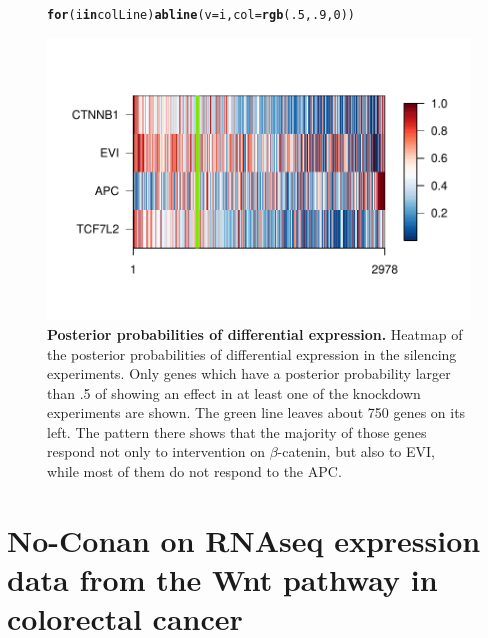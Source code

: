 \documentclass[a4paper]{article}\usepackage[]{graphicx}\usepackage[]{color}
\makeatletter
\def\maxwidth{ %
  \ifdim\Gin@nat@width>\linewidth
    \linewidth
  \else
    \Gin@nat@width
  \fi
}
\newcommand{\hlnum}[1]{\textcolor[rgb]{0.686,0.059,0.569}{#1}}%
\newcommand{\hlstd}[1]{\textcolor[rgb]{0.345,0.345,0.345}{#1}}%
\newcommand{\hlkwa}[1]{\textcolor[rgb]{0.161,0.373,0.58}{\textbf{#1}}}%
\newcommand{\hlkwc}[1]{\textcolor[rgb]{0.333,0.667,0.333}{#1}}%
\newcommand{\hlkwd}[1]{\textcolor[rgb]{0.737,0.353,0.396}{\textbf{#1}}}%
\newenvironment{kframe}{%
 \def\at@end@of@kframe{}%
 \ifinner\ifhmode%
  \def\at@end@of@kframe{\end{minipage}}%
  \begin{minipage}{\columnwidth}%
 \fi\fi%
 \def\FrameCommand##1{\hskip\@totalleftmargin \hskip-\fboxsep
 \colorbox{shadecolor}{##1}\hskip-\fboxsep
     \hskip-\linewidth \hskip-\@totalleftmargin \hskip\columnwidth}%
 \MakeFramed {\advance\hsize-\width
   \@totalleftmargin\z@ \linewidth\hsize
   \@setminipage}}%
 {\par\unskip\endMakeFramed%
 \at@end@of@kframe}
\newenvironment{knitrout}{}{} %
\makeatother
\begin{document}
\begin{figure}[htbp]
\begin{center}
\begin{knitrout}
\begin{kframe}
\begin{alltt}
\hlkwa{for}\hlstd{(i} \hlkwa{in} \hlstd{colLine)} \hlkwd{abline}\hlstd{(}\hlkwc{v}\hlstd{=i,} \hlkwc{col}\hlstd{=}\hlkwd{rgb}\hlstd{(}\hlnum{.5}\hlstd{,}\hlnum{.9}\hlstd{,}\hlnum{0}\hlstd{))}
\end{alltt}
\end{kframe}
\includegraphics[width=\maxwidth]{figure/minPsRBgreen} 

\end{knitrout}
\caption{{\bf Posterior probabilities of differential expression.} Heatmap of the posterior probabilities of differential expression in the silencing experiments. Only genes which have a posterior probability larger than .5 of showing an effect in at least one of the knockdown experiments are shown. The green line leaves about 750 genes on its left. The pattern there shows that the majority of those genes respond not only to intervention on $\beta$-catenin, but also to EVI, while most of them do not respond to the APC.}
\label{fig:heatmap}
\end{center}
\end{figure}

\newpage
\section*{No-Conan on RNAseq expression data from the Wnt pathway in colorectal cancer}


\clearpage


\end{document}
